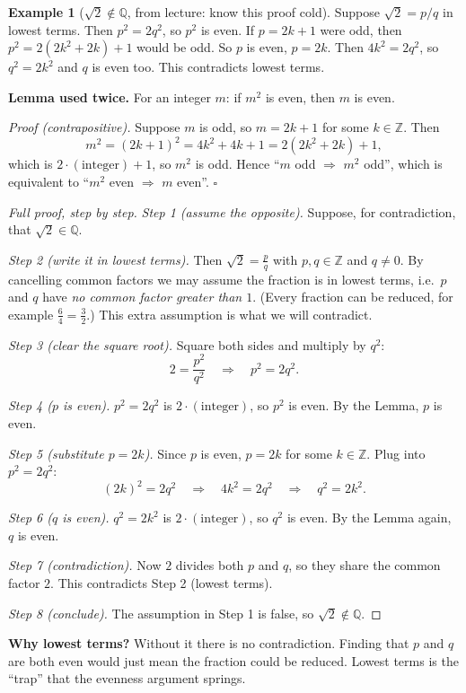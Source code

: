\documentclass[11pt]{article}
\theoremstyle{definition}
\newtheorem{ex}[defn]{Example}
\newcommand{\Z}{\mathbb{Z}}
\newcommand{\Q}{\mathbb{Q}}
\newcommand{\key}[1]{\textcolor{red!70!black}{\textbf{#1}}}
\begin{document}
\begin{ex}[$\sqrt2\notin\Q$, from lecture: know this proof cold]
Suppose $\sqrt2=p/q$ in lowest terms. Then $p^2=2q^2$, so $p^2$ is even.
If $p=2k+1$ were odd, then $p^2=2(2k^2+2k)+1$ would be odd. So $p$ is even,
$p=2k$. Then $4k^2=2q^2$, so $q^2=2k^2$ and $q$ is even too. This
contradicts lowest terms.

\medskip
\noindent\key{Lemma used twice.} For an integer $m$: if $m^2$ is even,
then $m$ is even.

\noindent\emph{Proof (contrapositive).} Suppose $m$ is odd, so $m=2k+1$
for some $k\in\Z$. Then
\[
m^2=(2k+1)^2=4k^2+4k+1=2(2k^2+2k)+1,
\]
which is $2\cdot(\text{integer})+1$, so $m^2$ is odd. Hence ``$m$ odd
$\Rightarrow$ $m^2$ odd'', which is equivalent to ``$m^2$ even
$\Rightarrow$ $m$ even''. $\square$

\begin{proof}[Full proof, step by step]
\emph{Step 1 (assume the opposite).} Suppose, for contradiction, that
$\sqrt2\in\Q$.

\emph{Step 2 (write it in lowest terms).} Then $\sqrt2=\frac pq$ with
$p,q\in\Z$ and $q\ne0$. By cancelling common factors we may assume the
fraction is in lowest terms, i.e.\ $p$ and $q$ have \emph{no common factor
greater than $1$}. (Every fraction can be reduced, for example
$\frac{6}{4}=\frac32$.) This extra assumption is what we will contradict.

\emph{Step 3 (clear the square root).} Square both sides and multiply by
$q^2$:
\[
2=\frac{p^2}{q^2}\quad\Longrightarrow\quad p^2=2q^2.
\]

\emph{Step 4 ($p$ is even).} $p^2=2q^2$ is $2\cdot(\text{integer})$, so
$p^2$ is even. By the Lemma, $p$ is even.

\emph{Step 5 (substitute $p=2k$).} Since $p$ is even, $p=2k$ for some
$k\in\Z$. Plug into $p^2=2q^2$:
\[
(2k)^2=2q^2\quad\Longrightarrow\quad 4k^2=2q^2
\quad\Longrightarrow\quad q^2=2k^2.
\]

\emph{Step 6 ($q$ is even).} $q^2=2k^2$ is $2\cdot(\text{integer})$, so
$q^2$ is even. By the Lemma again, $q$ is even.

\emph{Step 7 (contradiction).} Now $2$ divides both $p$ and $q$, so they
share the common factor $2$. This contradicts Step 2 (lowest terms).

\emph{Step 8 (conclude).} The assumption in Step 1 is false, so
$\sqrt2\notin\Q$.
\end{proof}

\noindent\key{Why lowest terms?} Without it there is no contradiction.
Finding that $p$ and $q$ are both even would just mean the fraction could
be reduced. Lowest terms is the ``trap'' that the evenness argument springs.


\end{ex}
\end{document}
